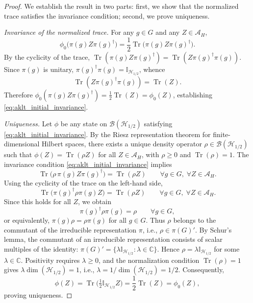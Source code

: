 \documentclass[12pt,a4paper]{article}
\begin{document}
\begin{proof}
We establish the result in two parts: first, we show that the normalized trace satisfies the invariance condition; second, we prove uniqueness.

\textit{Invariance of the normalized trace.} For any $g \in G$ and any $Z \in \mathcal{A}_H$,
\[
\phi_0\bigl( \pi(g) Z \pi(g)^\dagger \bigr) = \frac{1}{2} \operatorname{Tr}\bigl( \pi(g) Z \pi(g)^\dagger \bigr).
\]
By the cyclicity of the trace, $\operatorname{Tr}(\pi(g) Z \pi(g)^\dagger) = \operatorname{Tr}(Z \pi(g)^\dagger \pi(g))$. Since $\pi(g)$ is unitary, $\pi(g)^\dagger \pi(g) = \mathbb{I}_{\mathcal{H}_{1/2}}$, whence
\[
\operatorname{Tr}(Z \pi(g)^\dagger \pi(g)) = \operatorname{Tr}(Z).
\]
Therefore $\phi_0(\pi(g) Z \pi(g)^\dagger) = \frac{1}{2} \operatorname{Tr}(Z) = \phi_0(Z)$, establishing \eqref{eq:aklt_initial_invariance}.

\textit{Uniqueness.} Let $\phi$ be any state on $\mathcal{B}(\mathcal{H}_{1/2})$ satisfying \eqref{eq:aklt_initial_invariance}. By the Riesz representation theorem for finite-dimensional Hilbert spaces, there exists a unique density operator $\rho \in \mathcal{B}(\mathcal{H}_{1/2})$ such that $\phi(Z) = \operatorname{Tr}(\rho Z)$ for all $Z \in \mathcal{A}_H$, with $\rho \ge 0$ and $\operatorname{Tr}(\rho) = 1$. The invariance condition \eqref{eq:aklt_initial_invariance} implies
\[
\operatorname{Tr}\bigl( \rho \, \pi(g) Z \pi(g)^\dagger \bigr) = \operatorname{Tr}(\rho Z) \qquad \forall g \in G,\; \forall Z \in \mathcal{A}_H.
\]
Using the cyclicity of the trace on the left-hand side,
\[
\operatorname{Tr}\bigl( \pi(g)^\dagger \rho \pi(g) Z \bigr) = \operatorname{Tr}(\rho Z) \qquad \forall g \in G,\; \forall Z \in \mathcal{A}_H.
\]
Since this holds for all $Z$, we obtain
\[
\pi(g)^\dagger \rho \pi(g) = \rho \qquad \forall g \in G,
\]
or equivalently, $\pi(g) \rho = \rho \pi(g)$ for all $g \in G$. Thus $\rho$ belongs to the commutant of the irreducible representation $\pi$, i.e., $\rho \in \pi(G)'$. By Schur's lemma, the commutant of an irreducible representation consists of scalar multiples of the identity: $\pi(G)' = \{\lambda \mathbb{I}_{\mathcal{H}_{1/2}} : \lambda \in \mathbb{C}\}$. Hence $\rho = \lambda \mathbb{I}_{\mathcal{H}_{1/2}}$ for some $\lambda \in \mathbb{C}$. Positivity requires $\lambda \ge 0$, and the normalization condition $\operatorname{Tr}(\rho) = 1$ gives $\lambda \dim(\mathcal{H}_{1/2}) = 1$, i.e., $\lambda = 1/\dim(\mathcal{H}_{1/2}) = 1/2$. Consequently,
\[
\phi(Z) = \operatorname{Tr}\bigl( \tfrac{1}{2} \mathbb{I}_{\mathcal{H}_{1/2}} Z \bigr) = \frac{1}{2} \operatorname{Tr}(Z) = \phi_0(Z),
\]
proving uniqueness.
\end{proof}
\end{document}
